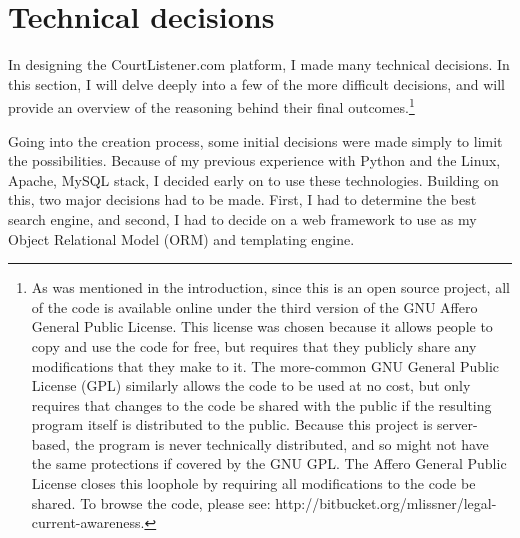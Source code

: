 \label{techdecisions}
\section{Technical decisions}
In designing the CourtListener.com platform, I made many technical decisions. In this section, I will delve deeply into a few of the more difficult decisions, and will provide an overview of the reasoning behind their final outcomes.\footnote{As was mentioned in the introduction, since this is an open source project, all of the code is available online under the third version of the GNU Affero General Public License. This license was chosen because it allows people to copy and use the code for free, but requires that they publicly share any modifications that they make to it. The more-common GNU General Public License (GPL) similarly allows the code to be used at no cost, but only requires that changes to the code be shared with the public if the resulting program itself is distributed to the public. Because this project is server-based, the program is never technically distributed, and so might not have the same protections if covered by the GNU GPL. The Affero General Public License closes this loophole by requiring all modifications to the code be shared. To browse the code, please see: http://bitbucket.org/mlissner/legal-current-awareness.}

Going into the creation process, some initial decisions were made simply to limit the possibilities. Because of my previous experience with Python and the Linux, Apache, MySQL stack, I decided early on to use these technologies. Building on this, two major decisions had to be made. First, I had to determine the best search engine, and second, I had to decide on a web framework to use as my Object Relational Model (ORM) and templating engine. 

